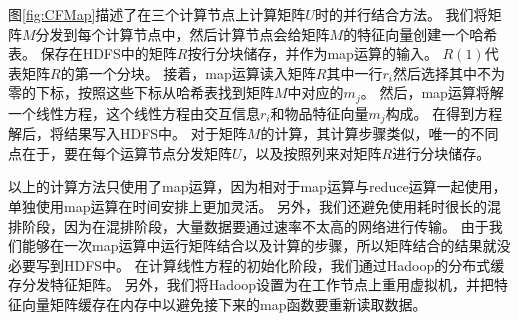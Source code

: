 图\ref{fig:CFMap}描述了在三个计算节点上计算矩阵$U$时的并行结合方法。
我们将矩阵$M$分发到每个计算节点中，然后计算节点会给矩阵$M$的特征向量创建一个哈希表。
保存在HDFS中的矩阵$R$按行分块储存，并作为map运算的输入。
$R(1)$代表矩阵$R$的第一个分块。
接着，map运算读入矩阵$R$其中一行$r_i$然后选择其中不为零的下标，按照这些下标从哈希表找到矩阵$M$中对应的$m_j$。
然后，map运算将解一个线性方程，这个线性方程由交互信息$r_i$和物品特征向量$m_j$构成。
在得到方程解后，将结果写入HDFS中。
对于矩阵$M$的计算，其计算步骤类似，唯一的不同点在于，要在每个运算节点分发矩阵$U$，以及按照列来对矩阵$R$进行分块储存。

以上的计算方法只使用了map运算，因为相对于map运算与reduce运算一起使用，单独使用map运算在时间安排上更加灵活。
另外，我们还避免使用耗时很长的混排阶段，因为在混排阶段，大量数据要通过速率不太高的网络进行传输。
由于我们能够在一次map运算中运行矩阵结合以及计算的步骤，所以矩阵结合的结果就没必要写到HDFS中。
在计算线性方程的初始化阶段，我们通过Hadoop的分布式缓存分发特征矩阵。
另外，我们将Hadoop设置为在工作节点上重用虚拟机，并把特征向量矩阵缓存在内存中以避免接下来的map函数要重新读取数据。


